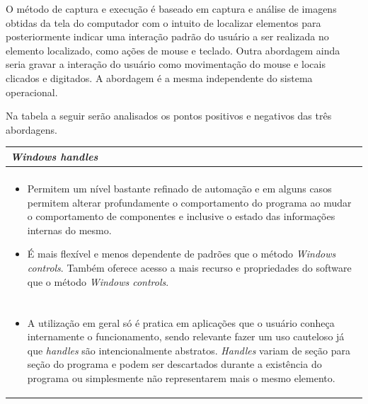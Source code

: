 \documentclass[tg]{mdtufsm}
\begin{document}
                O método de captura e execução é baseado em captura e análise de imagens obtidas da tela do computador com o intuito de localizar elementos para posteriormente indicar uma interação padrão do usuário a ser realizada no elemento localizado, como ações de mouse e teclado. Outra abordagem ainda seria gravar a interação do usuário como movimentação do mouse e locais clicados e digitados. A abordagem é a mesma independente do sistema operacional.

                Na tabela a seguir serão analisados os pontos positivos e negativos das três abordagens.

                \bigskip
                {\centering
                \begin{tabularx}{\textwidth}{|*{1}{>{\centering\arraybackslash}X}|}
                    \hline
                    \emph{Windows handles} \\
                    \hline
                    {\bf contras:} \\
                    \begin{itemize}
                        \item Permitem um nível bastante refinado de automação e em alguns casos permitem alterar profundamente o comportamento do programa ao mudar o comportamento de componentes e inclusive o estado das informações internas do mesmo.
                        \item É mais flexível e menos dependente de padrões que o método \emph{Windows controls}. Também oferece acesso a mais recurso e propriedades do software que o método \emph{Windows controls}.
                    \end{itemize}
                    \\ {\bf contras:} \\
                    \begin{itemize}
                        \item A utilização em geral só é pratica em aplicações que o usuário conheça internamente o funcionamento, sendo relevante fazer um uso cauteloso já que \emph{handles} são intencionalmente abstratos. \emph{Handles} variam de seção para seção do programa e podem ser descartados durante a existência do programa ou simplesmente não representarem mais o mesmo elemento.
                    \end{itemize}
                    \\ \hline
                \end{tabularx}

}
\end{document}
